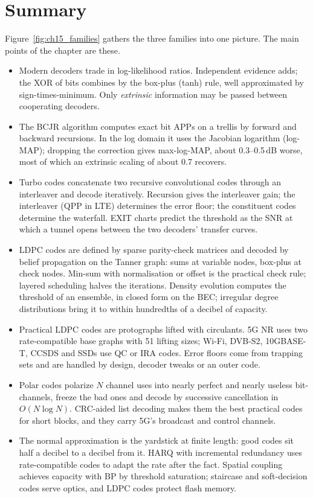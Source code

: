 \section{Summary}

Figure~\ref{fig:ch15_families} gathers the three families into one picture. The main points of the
chapter are these.

\begin{itemize}
\item Modern decoders trade in log-likelihood ratios. Independent evidence adds; the XOR of bits
combines by the box-plus (tanh) rule, well approximated by sign-times-minimum. Only
\emph{extrinsic} information may be passed between cooperating decoders.
\item The BCJR algorithm computes exact bit APPs on a trellis by forward and backward recursions.
In the log domain it uses the Jacobian logarithm (log-MAP); dropping the correction gives max-log-MAP,
about 0.3--0.5\,dB worse, most of which an extrinsic scaling of about 0.7 recovers.
\item Turbo codes concatenate two recursive convolutional codes through an interleaver and decode
iteratively. Recursion gives the interleaver gain; the interleaver (QPP in LTE) determines the error
floor; the constituent codes determine the waterfall. EXIT charts predict the threshold as the SNR
at which a tunnel opens between the two decoders' transfer curves.
\item LDPC codes are defined by sparse parity-check matrices and decoded by belief propagation on the
Tanner graph: sums at variable nodes, box-plus at check nodes. Min-sum with normalisation or offset
is the practical check rule; layered scheduling halves the iterations. Density evolution computes
the threshold of an ensemble, in closed form on the BEC; irregular degree distributions bring it to
within hundredths of a decibel of capacity.
\item Practical LDPC codes are protographs lifted with circulants. 5G NR uses two rate-compatible
base graphs with 51 lifting sizes; Wi-Fi, DVB-S2, 10GBASE-T, CCSDS and SSDs use QC or IRA codes.
Error floors come from trapping sets and are handled by design, decoder tweaks or an outer code.
\item Polar codes polarize $N$ channel uses into nearly perfect and nearly useless bit-channels,
freeze the bad ones and decode by successive cancellation in $O(N\log N)$. CRC-aided list decoding
makes them the best practical codes for short blocks, and they carry 5G's broadcast and control
channels.
\item The normal approximation is the yardstick at finite length: good codes sit half a decibel to a
decibel from it. HARQ with incremental redundancy uses rate-compatible codes to adapt the rate after
the fact. Spatial coupling achieves capacity with BP by threshold saturation; staircase and
soft-decision codes serve optics, and LDPC codes protect flash memory.
\end{itemize}

